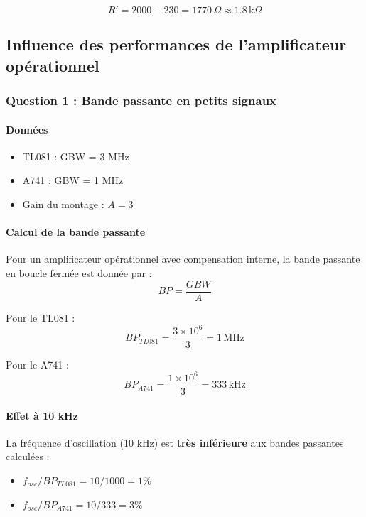 \documentclass[11pt,a4paper]{article}
\begin{document}
\begin{equation}
\boxed{R' = 2000 - 230 = 1770 \, \Omega \approx 1.8 \, \text{k}\Omega}
\end{equation}

\subsection{Influence des performances de l'amplificateur opérationnel}

\subsubsection{Question 1 : Bande passante en petits signaux}

\paragraph{Données}
\begin{itemize}
    \item TL081 : GBW = 3 MHz
    \item A741 : GBW = 1 MHz
    \item Gain du montage : $A = 3$
\end{itemize}

\paragraph{Calcul de la bande passante}

Pour un amplificateur opérationnel avec compensation interne, la bande passante en boucle fermée est donnée par :
\begin{equation}
BP = \frac{GBW}{A}
\end{equation}

Pour le TL081 :
\begin{equation}
\boxed{BP_{TL081} = \frac{3 \times 10^6}{3} = 1 \, \text{MHz}}
\end{equation}

Pour le A741 :
\begin{equation}
\boxed{BP_{A741} = \frac{1 \times 10^6}{3} = 333 \, \text{kHz}}
\end{equation}

\paragraph{Effet à 10 kHz}

La fréquence d'oscillation (10 kHz) est \textbf{très inférieure} aux bandes passantes calculées :
\begin{itemize}
    \item $f_{osc} / BP_{TL081} = 10/1000 = 1\%$
    \item $f_{osc} / BP_{A741} = 10/333 = 3\%$
\end{itemize}
\end{document}
